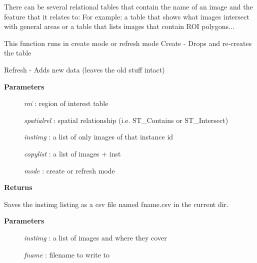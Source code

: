 \documentclass[letterpaper,10pt,english]{sphinxmanual}
\begin{document}
\begin{fulllineitems}
\begin{fulllineitems}
\begin{description}
\end{description}

\end{fulllineitems}


\begin{fulllineitems}
\label{code:Database.Database.instimg2db}
There can be several relational tables that contain the name of an image
and the feature that it relates to:
For example:  a table that shows what images intersect with general areas or
a table that lists images that contain ROI polygons...

This function runs in create mode or refresh mode
Create - Drops and re-creates the table

Refresh - Adds new data (leaves the old stuff intact)
\begin{description}
\item[{\textbf{Parameters}}] \leavevmode
\emph{roi}   :   region of interest table

\emph{spatialrel}    :   spatial relationship (i.e. ST\_Contains or ST\_Intersect)

\emph{instimg}  :    a list of only images of that instance id

\emph{copylist}  :   a list of images + inst

\emph{mode}  :   create or refresh mode

\end{description}

\textbf{Returns}

\end{fulllineitems}


\begin{fulllineitems}
\label{code:Database.Database.instimgExport}
Saves the instimg listing as a csv file named fname.csv in the current dir.
\begin{description}
\item[{\textbf{Parameters}}] \leavevmode
\emph{instimg}   :  a list of images and where they cover

\emph{fname}    :    filename to write to

\end{description}


\end{fulllineitems}
\end{fulllineitems}
\end{document}
